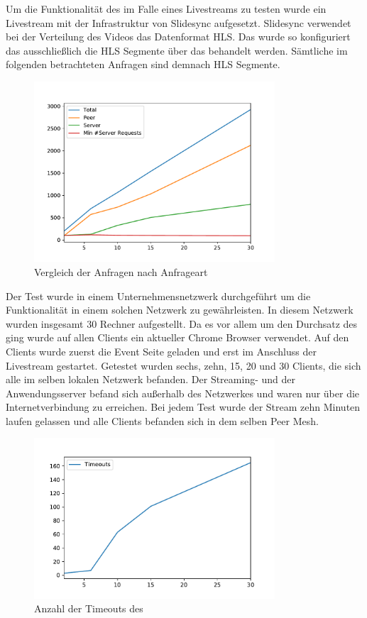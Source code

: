 Um die Funktionalität des \cdns im Falle eines Livestreams zu testen wurde ein Livestream mit der Infrastruktur von Slidesync aufgesetzt. Slidesync verwendet bei der Verteilung des Videos das Datenformat HLS. Das \cdn wurde so konfiguriert das ausschließlich die HLS Segmente über das \cdn behandelt werden. Sämtliche im folgenden betrachteten Anfragen sind demnach HLS Segmente. 
\begin{figure}[!h]
	\centering
	\includegraphics[width=0.8\textwidth]{figures/clients_line_chart}
	\caption[A Figure Short-Title]{Vergleich der Anfragen nach Anfrageart}
	\label{fig:live_stream_line_chart}
\end{figure}
Der Test wurde in einem Unternehmensnetzwerk durchgeführt um die Funktionalität in einem solchen Netzwerk zu gewährleisten. In diesem Netzwerk wurden insgesamt 30 Rechner aufgestellt. Da es vor allem um den Durchsatz des \cdns ging wurde auf allen Clients ein aktueller Chrome Browser verwendet. Auf den Clients wurde zuerst die Event Seite geladen und erst im Anschluss der Livestream gestartet. Getestet wurden sechs, zehn, 15, 20 und 30 Clients, die sich alle im selben lokalen Netzwerk befanden. Der Streaming- und der Anwendungsserver befand sich außerhalb des Netzwerkes und waren nur über die Internetverbindung zu erreichen. Bei jedem Test wurde der Stream zehn Minuten laufen gelassen und alle Clients befanden sich in dem selben Peer Mesh.

\begin{figure}[!h]
	\centering
	\includegraphics[width=0.8\textwidth]{figures/timeouts}
	\caption[A Figure Short-Title]{Anzahl der Timeouts des \cdns}
	\label{fig:timeouts}
\end{figure}


